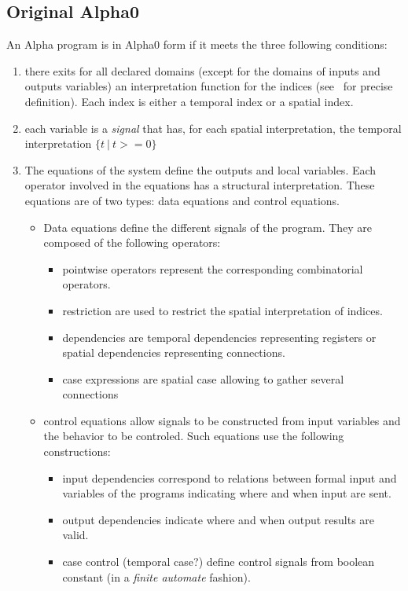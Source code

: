 \documentclass[a4paper,11pt]{article}
\newcommand{\Alpha}{{{Alpha}}}
\newcommand{\AlphaZ}{{{\Alpha}0}}
\begin{document}
\subsection{Original {\AlphaZ}}
An {\Alpha} program is in {\AlphaZ} form if it meets the three following conditions:
\begin{enumerate}
\item there exits for all declared domains (except for the domains of 
inputs and outputs variables) an interpretation function for the indices
(see~\cite{dezan} for precise definition). Each index is either 
a temporal index or a spatial index.

\item each variable is a {\em signal} that has, for each spatial
interpretation, the temporal interpretation $\{t ~|~ t>=0\}$

\item The equations of the system define the outputs and local variables.
Each operator involved in the equations has a structural interpretation. 
These equations are of two types: data equations and control equations.
\begin{itemize} 
\item Data equations define the different signals of the program.
They are composed of the following operators:  
\begin{itemize} 
  \item pointwise operators represent the corresponding combinatorial 
operators. 
  \item restriction are used to restrict the spatial interpretation of 
indices.
\item  dependencies are temporal dependencies representing registers or
 spatial dependencies representing connections.
\item case expressions are spatial case allowing to gather several connections
\end{itemize}
\item control equations allow signals to be constructed from input variables
and the behavior to be controled. 
Such equations use the following constructions:
\begin{itemize}
\item input dependencies correspond to relations between formal 
input and variables of the programs indicating where and when 
input are sent.
\item output dependencies indicate where and when output results are valid.
\item case control (temporal case?)
 define control signals from boolean constant
(in a {\em finite automate} fashion). 
\end{itemize}
\end{itemize}
\end{enumerate}
\end{document}
